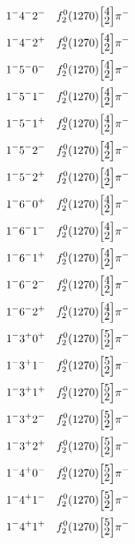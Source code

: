 \documentclass[10pt,a4paper]{article}
\def\dst{\displaystyle}
\def\vsp{\hbox{\vrule height12.5pt depth3.5pt width0pt}}
\def\ells#1#2{\Big[\hskip-5pt\vsp\begin{array}{c}\dst#1\\[-4pt]\dst#2\end{array}\vsp\hskip-5pt\Big]}
\begin{document}
\begin{align*} 
 \begin{aligned}
1^{-}4^{-}2^{-}\quad & f_2^0(1270)\ells{4}{2}\pi^-\\
1^{-}4^{-}2^{+}\quad & f_2^0(1270)\ells{4}{2}\pi^-\\
1^{-}5^{-}0^{-}\quad & f_2^0(1270)\ells{4}{2}\pi^-\\
1^{-}5^{-}1^{-}\quad & f_2^0(1270)\ells{4}{2}\pi^-\\
1^{-}5^{-}1^{+}\quad & f_2^0(1270)\ells{4}{2}\pi^-\\
1^{-}5^{-}2^{-}\quad & f_2^0(1270)\ells{4}{2}\pi^-\\
1^{-}5^{-}2^{+}\quad & f_2^0(1270)\ells{4}{2}\pi^-\\
1^{-}6^{-}0^{+}\quad & f_2^0(1270)\ells{4}{2}\pi^-\\
1^{-}6^{-}1^{-}\quad & f_2^0(1270)\ells{4}{2}\pi^-\\
1^{-}6^{-}1^{+}\quad & f_2^0(1270)\ells{4}{2}\pi^-\\
1^{-}6^{-}2^{-}\quad & f_2^0(1270)\ells{4}{2}\pi^-\\
1^{-}6^{-}2^{+}\quad & f_2^0(1270)\ells{4}{2}\pi^-\\
1^{-}3^{+}0^{+}\quad & f_2^0(1270)\ells{5}{2}\pi^-\\
1^{-}3^{+}1^{-}\quad & f_2^0(1270)\ells{5}{2}\pi^-\\
1^{-}3^{+}1^{+}\quad & f_2^0(1270)\ells{5}{2}\pi^-\\
1^{-}3^{+}2^{-}\quad & f_2^0(1270)\ells{5}{2}\pi^-\\
1^{-}3^{+}2^{+}\quad & f_2^0(1270)\ells{5}{2}\pi^-\\
1^{-}4^{+}0^{-}\quad & f_2^0(1270)\ells{5}{2}\pi^-\\
1^{-}4^{+}1^{-}\quad & f_2^0(1270)\ells{5}{2}\pi^-\\
1^{-}4^{+}1^{+}\quad & f_2^0(1270)\ells{5}{2}\pi^-\\
\end{aligned} 
 \end{align*}\pagebreak
\end{document}
